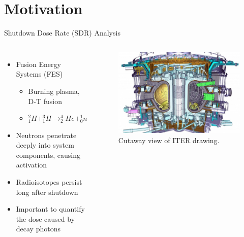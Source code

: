 \documentclass{beamer}
\begin{document}
\section{Motivation}
\begin{frame}{Shutdown Dose Rate (SDR) Analysis}
\begin{columns}
\begin{itemize}
	\item{Fusion Energy Systems (FES)}
		\begin{itemize}
			\item{Burning plasma, D-T fusion}
			\item{$^{2}_{1}H + ^{3}_{1}H \rightarrow ^{4}_{2}He + ^{1}_{0} n$}
		\end{itemize}
	\item{Neutrons penetrate deeply into system components,
				causing activation}
	\item{Radioisotopes persist long after shutdown}
	\item{Important to quantify the dose caused by decay photons}
\end{itemize}
\begin{figure}
	\centering
	\includegraphics[scale=0.22]{iter.jpg}
	\caption{Cutaway view of ITER drawing.}
\end{figure}

\end{columns}
		
\end{frame}
\end{document}
